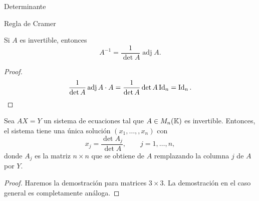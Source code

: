 \begin{chapter}{Determinante}
\begin{section}{Regla de Cramer}
                 \begin{corolario}\label{cor-inv-x-det}
                     Si $A$  es invertible,  entonces 
                     \begin{equation*}
                     A^{-1} = \frac{1}{\det A} \operatorname{adj}A.
                     \end{equation*}
                 \end{corolario}
                 \begin{proof}
                     \begin{equation*}
                     \frac{1}{\det A} \operatorname{adj}A\cdot A = \frac{1}{\det A}\det A \operatorname{Id}_n = \operatorname{Id}_n.
                     \end{equation*}
                 \end{proof}
                 
                 
                 
                 \begin{teorema} Sea $AX=Y$ un sistema de ecuaciones tal que $A \in M_n(\mathbb K)$ es invertible. Entonces, el sistema tiene una única solución $(x_1,\ldots,,x_n)$ con 
                     \begin{equation*}
                     x_j = \frac{\det A_j}{\det A},\qquad j=1,\ldots,n,
                     \end{equation*}
                     donde $A_j$ es la matriz $n \times n$ que se obtiene de $A$ remplazando la columna $j$ de
                     $A$ por $Y$.
                 \end{teorema}
                 \begin{proof}
                     Haremos la demostración para matrices $3 \times 3$. La demostración en el caso general es completamente análoga. 
                     

\end{proof}
\end{section}
\end{chapter}
